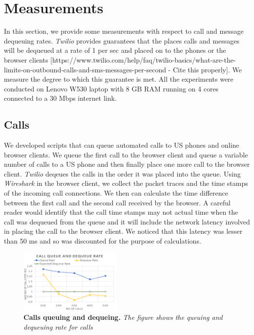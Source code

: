 \section{Measurements}
\label{sec-measurements}

In this section, we provide some measurements with respect to call and message dequeuing rates. \textit{Twilio} provides guarantees that the places calls and messages will be dequeued at a rate of 1 per sec and placed on to the phones or the browser clients [https://www.twilio.com/help/faq/twilio-basics/what-are-the-limits-on-outbound-calls-and-sms-messages-per-second - Cite this properly]. We measure the degree to which this guarantee is met. All the experiments were conducted on Lenovo W530 laptop with 8 GB RAM running on 4 cores connected to a 30 Mbps internet link.

\subsection{Calls}
\label{sec-measurements-calls}
We developed scripts that can queue automated calls to US phones and online browser clients. We queue the first call to the browser client and queue a variable number of calls to a US phone and then finally place one more call to the browser client. \textit{Twilio} deqeues the calls in the order it was placed into the queue. Using \textit{Wireshark} in the browser client, we collect the packet traces and the time stamps of the incoming call connections. We then can calculate the time difference between the first call and the second call received by the browser. A careful reader would identify that the call time stamps may not actual time when the call was dequeued from the queue and it will include the network latency involved in placing the call to the browser client. We noticed that this latency was lesser than 50 ms and so was discounted for the purpose of calculations. 

\begin{figure} \centering
\includegraphics[width=0.45\textwidth]{graphs/calls.pdf}
\caption{\textbf{Calls queuing and dequeing.} {\footnotesize\textit{
The figure shows the queuing and dequeuing rate for calls
}}}
\label{fig:calls}
\end{figure}

